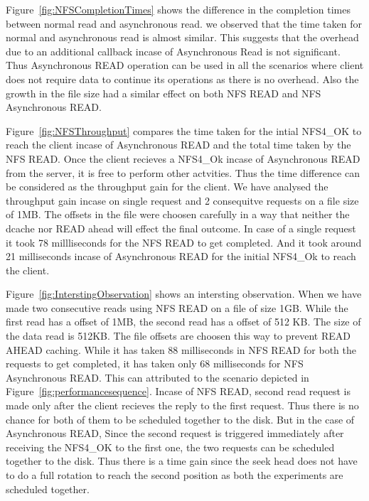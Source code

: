 	Figure~\ref{fig:NFSCompletionTimes} shows the  difference in the completion times between normal read and asynchronous read. we observed that the time taken for normal and asynchronous read is almost similar. This suggests that the overhead due to an additional callback incase of Asynchronous Read is not significant. Thus Asynchronous READ operation can be used in all the scenarios where client does not require data to continue its operations as there is no overhead. Also the growth in the file size had a similar effect on both NFS READ and NFS Asynchronous READ. 




	Figure~\ref{fig:NFSThroughput} compares the  time taken for the intial NFS4\_OK to reach the client incase of Asynchronous READ and the total time taken by the NFS READ.
Once the client recieves a NFS4\_Ok incase of Asynchronous READ from the server, it is free to perform other actvities. Thus the time difference can be considered as the throughput gain for the client. We have analysed the throughput gain incase on single request and 2 consequitve requests on a file size of 1MB. The offsets in the file were choosen carefully in a way that neither the dcache nor READ ahead will effect the final outcome. In case of a single request it took 78 millliseconds for the NFS READ to get completed. And it took around 21 milliseconds incase of Asynchronous READ for the initial NFS4\_Ok  to reach the client. 




 Figure~\ref{fig:InterstingObservation} shows an intersting observation. When we have made two consecutive reads  using NFS READ on a file of size 1GB. While the first read has a offset of 1MB, the second read has a offset of 512 KB. The size of the data read is 512KB. The file offsets are choosen this way to prevent READ AHEAD caching. While it has taken 88 milliseconds  in NFS READ for both the requests to get completed, it has taken only 68 milliseconds for NFS Asynchronous READ. This can attributed to the scenario depicted  in   Figure~\ref{fig:performancesequence}. Incase of NFS READ, second read request is made only after the client recieves the reply to the first request. Thus there is no chance for both of them to be scheduled together to the disk. But in the case of Asynchronous READ, Since the second request is triggered immediately after receiving the NFS4\_OK to the first one, the two requests can be scheduled together to the disk. Thus there is a time gain since the seek head does not have to do a full rotation to reach the second position as both the experiments are scheduled together.    


